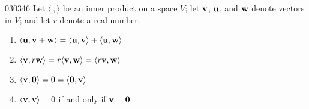 \begin{theorem}{}{030346}
Let $\langle\ , \rangle$ be an inner product on a space $V$; let $\textbf{v}$, $\textbf{u}$, and $\textbf{w}$ denote vectors in $V$; and let $r$ denote a real number.

\begin{enumerate}
\item $\langle \textbf{u}, \textbf{v} + \textbf{w}\rangle =
  \langle\textbf{u}, \textbf{v}\rangle + \langle\textbf{u}, \textbf{w}\rangle$

\item $\langle\textbf{v}, r\textbf{w}\rangle =  r\langle\textbf{v}, \textbf{w}\rangle = \langle r\textbf{v}, \textbf{w}\rangle$

\item $\langle\textbf{v}, \textbf{0}\rangle = 0 = \langle\textbf{0}, \textbf{v} \rangle $

\item $\langle\textbf{v}, \textbf{v}\rangle = 0$ if and only if $\textbf{v} = \textbf{0}$

\end{enumerate}
\end{theorem}

